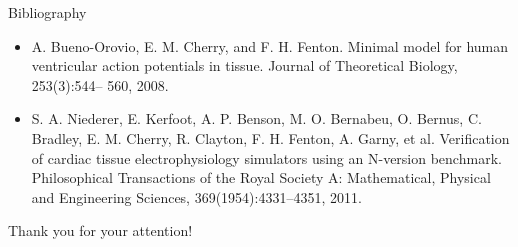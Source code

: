 \documentclass{beamer}
\begin{document}
\begin{frame}{Bibliography}
\begin{itemize}
\item A. Bueno-Orovio, E. M. Cherry, and F. H. Fenton. Minimal model for human
ventricular action potentials in tissue. Journal of Theoretical Biology, 253(3):544–
560, 2008.
\item S. A. Niederer, E. Kerfoot, A. P. Benson, M. O. Bernabeu, O. Bernus, C. Bradley, E. M. Cherry, R. Clayton, F. H. Fenton, A. Garny, et al. Verification of cardiac
tissue electrophysiology simulators using an N-version benchmark. Philosophical
Transactions of the Royal Society A: Mathematical, Physical and Engineering Sciences,
369(1954):4331–4351, 2011.
\end{itemize}

\end{frame}

\begin{frame}
    \centering
    \vfill

    {\Huge Thank you for your attention!}

    \vfill
\end{frame}
\end{document}

